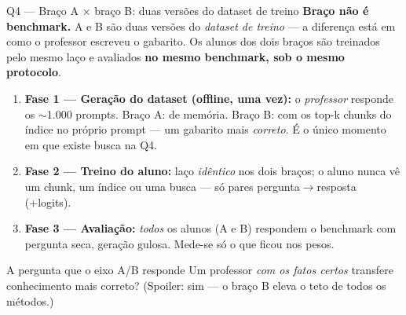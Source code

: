 \documentclass[10pt,aspectratio=169]{beamer}
\begin{document}
\begin{frame}{Q4 — Braço A $\times$ braço B: duas versões do dataset de treino}
  \small \textbf{Braço não é benchmark.} A e B são duas versões do \emph{dataset de treino} — a
  diferença está em como o professor escreveu o gabarito. Os alunos dos dois braços são treinados
  pelo mesmo laço e avaliados \textbf{no mesmo benchmark, sob o mesmo protocolo}.
  \vspace{4pt}
  \begin{enumerate}\small
    \item \textbf{Fase 1 — Geração do dataset (offline, uma vez):} o \emph{professor} responde os
      $\sim$1.000 prompts. Braço A: de memória. Braço B: com os top-k chunks do índice no
      próprio prompt — um gabarito mais \emph{correto}. É o único momento em que existe busca na Q4.
    \item \textbf{Fase 2 — Treino do aluno:} laço \emph{idêntico} nos dois braços; o aluno nunca vê
      um chunk, um índice ou uma busca — só pares pergunta$\to$resposta (+logits).
    \item \textbf{Fase 3 — Avaliação:} \emph{todos} os alunos (A e B) respondem o benchmark com
      pergunta seca, geração gulosa. Mede-se só o que ficou nos pesos.
  \end{enumerate}
  \vspace{4pt}
  \begin{block}{\small A pergunta que o eixo A/B responde}
    \small Um professor \emph{com os fatos certos} transfere conhecimento mais correto?
    (Spoiler: sim — o braço B eleva o teto de todos os métodos.)
  \end{block}
\end{frame}

\end{document}

